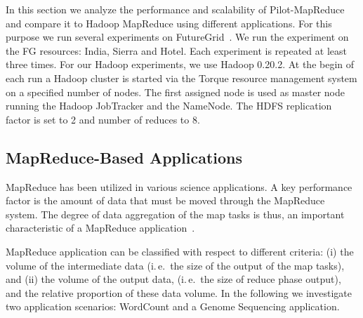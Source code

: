 \documentclass{acm_proc_article-sp}
\newcommand{\jhanote}[1]{ {\textcolor{red} { ***shantenu: #1 }}}
\newcommand{\alnote}[1]{ {\textcolor{blue} { ***andreL: #1 }}}
\newcommand{\alnote}[1]{}
\newcommand{\jhanote}[1]{}
\newcommand{\pilotmapreduce}{Pilot-MapReduce\xspace}
\begin{document}
In this section we analyze the performance and scalability of  \pilotmapreduce and compare it to Hadoop MapReduce using different applications.
For this purpose we run several experiments on FutureGrid~\cite{fg}. We run the
experiment on the FG resources: India, Sierra and Hotel. Each experiment is
repeated at least three times. For our Hadoop experiments, we use Hadoop 0.20.2. At the begin of each run a 
Hadoop cluster is started via the Torque resource management system on a
specified number of nodes. The first assigned node is used as master node
running the Hadoop JobTracker and the NameNode. The HDFS replication factor is 
set to 2 and number of reduces to 8.

\subsection{MapReduce-Based Applications}

MapReduce has been utilized in various science applications. A key performance 
factor is the amount of data that must be moved through the MapReduce system. 
The degree of data aggregation of the map tasks is thus, an important 
characteristic of a MapReduce application~\cite{weissman-mr-11}.

MapReduce application can be classified with respect to different
criteria: (i) the volume of the intermediate data (i.\,e.\ the size of
the output of the map tasks), and (ii) the volume of the output data,
(i.\,e.\ the size of reduce phase output), and the relative proportion
of these data volume. In the following we investigate two application
scenarios: WordCount and a Genome Sequencing application.

\end{document}
